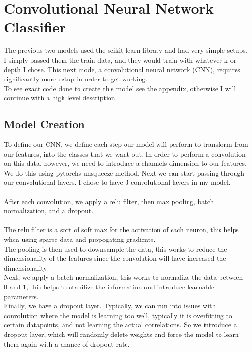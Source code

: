 \documentclass[12pt,a4paper]{article}
\begin{document}
    \clearpage
    \section{Convolutional Neural Network Classifier}
    The previous two models used the scikit-learn library and had very simple setups. I simply passed them
    the train data, and they would train with whatever k or depth I chose. This next mode, a convolutional
    neural network (CNN), requires significantly more setup in order to get working.
    \\
    To see exact code done to create this model see the appendix, otherwise I will continue with a high level
    description.

    \subsection{Model Creation}
    To define our CNN, we define each step our model will perform to transform from our features, into the
    classes that we want out. In order to perform a convolution on this data, however, we need to introduce
    a channels dimension to our features. We do this using pytorchs unsqueeze method. Next we can start passing
    through our convolutional layers. I chose to have 3 convolutional layers in my model.
    \\
    \\
    After each convolution, we apply a relu filter, then max pooling, batch normalization, and a dropout.
    \\
    \\
    The relu filter is a sort of soft max for the activation of each neuron, this helps when using sparse
    data and propogating gradients.
    \\
    The pooling is then used to downsample the data, this works to reduce
    the dimensionality of the features since the convolution will have increased the dimensionality.
    \\
    Next, we apply a batch normalization, this works to normalize the data between 0 and 1, this helps
    to stabilize the information and introduce learnable parameters.
    \\
    Finally, we have a dropout layer. Typically, we can run into issues with convolution where the model
    is learning too well, typically it is overfitting to certain datapoints, and not learning the actual
    correlations. So we introduce a dropout layer, which will randomly
    delete weights and force the model to learn them again with a chance of dropout rate.
\end{document}
